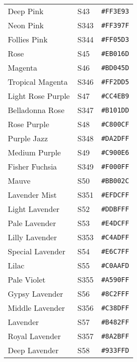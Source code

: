 \documentclass[a4paper]{article}
\begin{document}
\begin{longtable}{|l|l|r|}
Deep Pink & S43 & \texttt{\#FF3E93} \cellcolor[HTML]{FF3E93} \\
Neon Pink & S343 & \texttt{\#FF397F} \cellcolor[HTML]{FF397F} \\
Follies Pink & S344 & \texttt{\#FF05D3} \cellcolor[HTML]{FF05D3} \\
Rose & S45 & \texttt{\#EB016D} \cellcolor[HTML]{EB016D} \\
Magenta & S46 & \texttt{\#BD045D} \cellcolor[HTML]{BD045D} \\
Tropical Magenta & S346 & \texttt{\#FF2DD5} \cellcolor[HTML]{FF2DD5} \\
Light Rose Purple & S47 & \texttt{\#CC4EB9} \cellcolor[HTML]{CC4EB9} \\
Belladonna Rose & S347 & \texttt{\#B101DD} \cellcolor[HTML]{B101DD} \\
Rose Purple & S48 & \texttt{\#C800CF} \cellcolor[HTML]{C800CF} \\
Purple Jazz & S348 & \texttt{\#DA2DFF} \cellcolor[HTML]{DA2DFF} \\
Medium Purple & S49 & \texttt{\#C900E6} \cellcolor[HTML]{C900E6} \\
Fisher Fuchsia & S349 & \texttt{\#F000FF} \cellcolor[HTML]{F000FF} \\
Mauve & S50 & \texttt{\#BB002C} \cellcolor[HTML]{BB002C} \\
Lavender Mist & S351 & \texttt{\#EFDCFF} \cellcolor[HTML]{EFDCFF} \\
Light Lavender & S52 & \texttt{\#DDBFFF} \cellcolor[HTML]{DDBFFF} \\
Pale Lavender & S53 & \texttt{\#E4DCFF} \cellcolor[HTML]{E4DCFF} \\
Lilly Lavender & S353 & \texttt{\#C4ADFF} \cellcolor[HTML]{C4ADFF} \\
Special Lavender & S54 & \texttt{\#E6C7FF} \cellcolor[HTML]{E6C7FF} \\
Lilac & S55 & \texttt{\#C0AAFD} \cellcolor[HTML]{C0AAFD} \\
Pale Violet & S355 & \texttt{\#A590FF} \cellcolor[HTML]{A590FF} \\
Gypsy Lavender & S56 & \texttt{\#8C2FFF} \cellcolor[HTML]{8C2FFF} \\
Middle Lavender & S356 & \texttt{\#C38DFF} \cellcolor[HTML]{C38DFF} \\
Lavender & S57 & \texttt{\#B482FF} \cellcolor[HTML]{B482FF} \\
Royal Lavender & S357 & \texttt{\#8A2BFF} \cellcolor[HTML]{8A2BFF} \\
Deep Lavender & S58 & \texttt{\#933FFD} \cellcolor[HTML]{933FFD} \\

\end{longtable}
\end{document}
